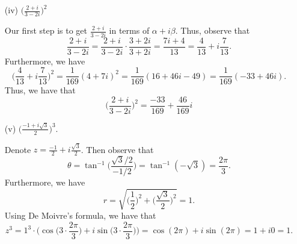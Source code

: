 \documentclass[a4paper]{article}
\begin{document}
\begin{enumerate}
\begin{solution}
            \end{solution}
            \item[(iv)] \( \Big(  \frac{ 2 + i  }{ 3 -2i }  \Big)^{2} \)
                \begin{solution}
                Our first step is to get \( \frac{ 2 + i  }{  3 -2i }  \) in terms of \( \alpha + i \beta  \). Thus, observe that
                \[  \frac{ 2 + i  }{ 3 - 2i } = \frac{ 2 + i  }{ 3 - 2i } \cdot \frac{ 3 + 2i }{ 3 + 2i } = \frac{ 7i + 4  }{ 13 } = \frac{ 4 }{ 13 }  + i \frac{ 7 }{ 13 }.    \]
               Furthermore, we have 
               \[  \Big(  \frac{ 4 }{ 13 } + i \frac{ 7 }{ 13 }  \Big)^{2} = \frac{ 1 }{ 169 } ( 4 + 7i)^{2} = \frac{ 1 }{ 169  } (16 + 46i - 49) = \frac{ 1 }{ 169  }(-33 + 46i).    \]
               Thus, we have that 
               \[  \Big(  \frac{ 2 + i  }{ 3 -2i }  \Big)^{2} = \frac{ -33 }{ 169  } + \frac{ 46 }{ 169 }i  \]
                \end{solution}
            \item[(v)] \( \Big(  \frac{ - 1 + i \sqrt{ 3 }  }{ 2 }  \Big)^{3} \).
                \begin{solution}
                   Denote \( z = \frac{ -1 }{ 2 }  + i \frac{ \sqrt{ 3 }  }{ 2 }  \). Then observe that  
                   \[  \theta = \tan^{-1} \Big(  \frac{ \sqrt{ 3 } / 2 }{ -1 / 2 }  \Big) = \tan^{-1}(- \sqrt{ 3 } ) = \frac{ 2 \pi  }{ 3 }.   \]
                   Furthermore, we have
                   \[  r = \sqrt{ \Big(  \frac{ 1 }{ 2 }  \Big)^{2} + \Big(  \frac{ \sqrt{ 3 }  }{ 2 }  \Big)^{2} } = 1.   \]
                   Using De Moivre's formula, we have that 
                   \[  z^{3} = 1^{3} \cdot \Big(  \cos \Big( 3 \cdot \frac{ 2 \pi  }{ 3 }    \Big) + i \sin \Big(  3 \cdot \frac{ 2 \pi  }{ 3 }  \Big) \Big) = \cos(2 \pi) + i \sin(2 \pi ) = 1 + i0 = 1.  \]
                \end{solution}
        \end{enumerate}
\end{document}
